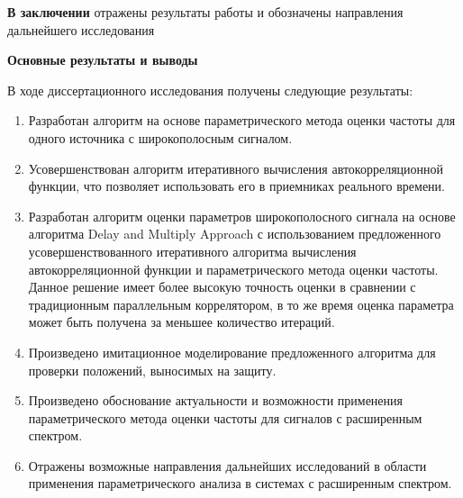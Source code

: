 {\bf{В заключении}}
отражены результаты работы и обозначены направления дальнейшего исследования

\noindent\centerline{\bf{Основные результаты и выводы}}
В ходе диссертационного исследования получены следующие результаты:
\begin{enumerate}
\item Разработан алгоритм на основе параметрического метода оценки частоты для одного источника с широкополосным сигналом.
\item Усовершенствован алгоритм итеративного вычисления автокорреляционной функции, что позволяет использовать его в приемниках
	реального времени.
\item Разработан алгоритм оценки параметров широкополосного сигнала на основе алгоритма Delay and Multiply Approach с использованием
	предложенного усовершенствованного итеративного алгоритма вычисления автокорреляционной функции и параметрического
	метода оценки частоты. Данное решение имеет более высокую точность оценки в сравнении с традиционным
	параллельным коррелятором, в то же время оценка параметра может быть получена за меньшее количество итераций.
\item Произведено имитационное моделирование предложенного алгоритма для проверки положений, выносимых на защиту.
\item Произведено обоснование актуальности и возможности применения параметрического метода оценки частоты для сигналов
	с расширенным спектром.
\item Отражены возможные направления дальнейших исследований в области применения параметрического анализа в системах
	с расширенным спектром.
\end{enumerate}
